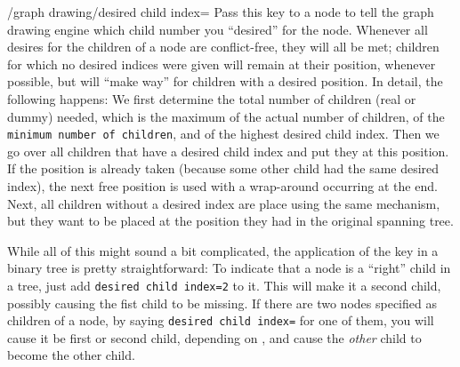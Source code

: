 \begin{key}{/graph drawing/desired child index=}
  Pass this key to a node to tell the graph drawing engine which child
  number you ``desired'' for the node. Whenever all desires for the
  children of a node are conflict-free, they will all be met; children
  for which no desired indices were given will remain at their
  position, whenever possible, but will ``make way'' for children with
  a desired position. In detail, the following happens: We first
  determine the total number of children (real or dummy) needed, which
  is the maximum of the actual number of children, of the
  \texttt{minimum number of children}, and of the highest desired
  child index. Then we go over all children that have a desired child
  index and put they at this position. If the position is already
  taken (because some other child had the same desired index), the
  next free position is used with a wrap-around occurring at the
  end. Next, all children without a desired index are place using the
  same mechanism, but they want to be placed at the position they had
  in the original spanning tree.

  While all of this might sound a bit complicated, the application of
  the key in a binary tree is pretty straightforward: To indicate that
  a node is a ``right'' child in a tree, just add \texttt{desired child index=2}
  to it. This will make it a second child, possibly causing the fist
  child to be missing. If there are two nodes specified as children of
  a node, by saying \texttt{desired child index=} for one
  of them, you will cause it be first or second child, depending on
  , and cause the \emph{other} child to become the other
  child.


\end{key}
